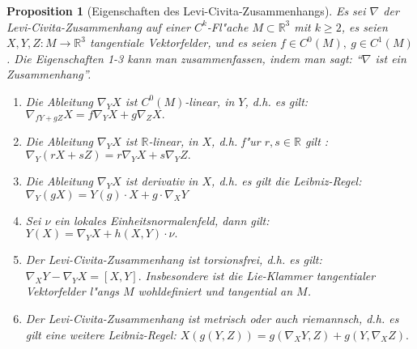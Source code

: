 \documentclass[10pt,a4paper]{article}
\newcommand{\fc}[1]{\special{fc=#1}}
\newtheorem{prop}[sat]{Proposition}
\begin{document}
\fc{PEigLeviC}
\begin{prop}[Eigenschaften des Levi-Civita-Zusammenhangs]
 Es sei $\nabla$ der Levi-Civita-Zusammenhang auf einer $C^k$-Fl"ache $M\subset \mathbb{R}^3$ mit $k\geq 2$, es seien $X,Y,Z:M\rightarrow\mathbb{R}^3$
 tangentiale Vektorfelder, und es seien $f\in C^0(M),\ g\in C^1(M)$. Die Eigenschaften 1-3 kann man zusammenfassen, indem man sagt: ``$\nabla$ ist ein Zusammenhang''.
 \begin{enumerate}
  \item  Die Ableitung $\nabla_Y X$ ist $C^0(M)$-linear, in $Y$, d.h. es gilt:\qquad
  $ \nabla_{fY+gZ} X = f\nabla_Y X + g\nabla_Z X.$

  \item  Die Ableitung $\nabla_Y X$ ist $\mathbb{R}$-linear, in $X$, d.h. f"ur $r,s\in \mathbb{R}$ gilt :\qquad
$   \nabla_Y (rX +sZ) = r\nabla_Y X + s\nabla_Y Z.$

  \item Die Ableitung $\nabla_Y X$ ist derivativ in $X$, d.h. es gilt die Leibniz-Regel:\qquad
   $\nabla_Y (gX) = Y(g)\cdot X + g\cdot \nabla_X Y$


 \item Sei $\nu$ ein lokales Einheitsnormalenfeld, dann gilt:\qquad
  $Y(X) = \nabla_Y X + h(X,Y)\cdot \nu.$

 \item Der Levi-Civita-Zusammenhang ist torsionsfrei, d.h. es gilt:\qquad
  $\nabla_X Y - \nabla_Y X = \left[X,Y\right].$
Insbesondere ist die Lie-Klammer tangentialer Vektorfelder l"angs $M$ wohldefiniert und tangential an $M$.
 
 \item Der Levi-Civita-Zusammenhang ist metrisch oder auch riemannsch, d.h. es gilt eine weitere Leibniz-Regel:\qquad
  $X(g(Y,Z)) = g(\nabla_X Y,Z) + g(Y, \nabla_X Z).$
 \end{enumerate}



\end{prop}
\end{document}
